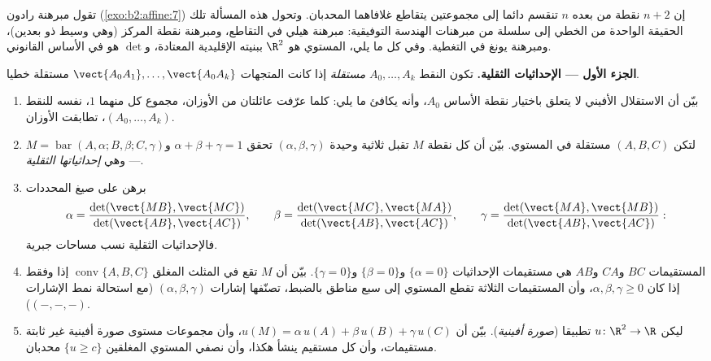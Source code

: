 \begin{problem}\label{pb:b2:affine:1}
تقول مبرهنة رادون (\cref{exo:b2:affine:7}) إن $n + 2$ نقطة من  بعده
$n$ تنقسم دائما إلى مجموعتين يتقاطع غلافاهما المحدبان. وتحول هذه
المسألة تلك الحقيقة الواحدة من  الخطي إلى سلسلة من مبرهنات
الهندسة التوفيقية: مبرهنة هيلي في التقاطع، ومبرهنة نقطة المركز (وهي
وسيط ذو بعدين)، ومبرهنة يونغ في التغطية. وفي كل ما يلي، المستوي هو
$\R^2$ ببنيته الإقليدية المعتادة، و$\det$ هو  في الأساس
القانوني.

\medskip
\noindent\textbf{الجزء الأول --- الإحداثيات الثقلية.} تكون النقط
$A_0, \dots, A_k$ \emph{مستقلة } إذا كانت المتجهات $\vect{A_0A_1}, \dots, \vect{A_0A_k}$ مستقلة خطيا.
\begin{enumerate}
  \item بيّن أن الاستقلال الأفيني لا يتعلق باختيار نقطة الأساس
        $A_0$، وأنه يكافئ ما يلي: كلما عرّفت عائلتان من الأوزان،
        مجموع كل منهما $1$،  نفسه للنقط $(A_0,
        \dots, A_k)$، تطابقت
        الأوزان.
  \item لتكن $(A, B, C)$ مستقلة  في المستوي. بيّن أن كل نقطة $M$
        تقبل ثلاثية وحيدة $(\alpha, \beta, \gamma)$ تحقق $\alpha + \beta +
        \gamma = 1$ و$M = \operatorname{bar}(A, \alpha; B,
        \beta; C, \gamma)$ --- وهي
        \emph{إحداثياتها الثقلية}.
  \item برهن على صيغ المحددات
        \[
        \alpha = \frac{\det(\vect{MB},
        \vect{MC})}{\det(\vect{AB}, \vect{AC})},
        \qquad
        \beta = \frac{\det(\vect{MC},
        \vect{MA})}{\det(\vect{AB}, \vect{AC})},
        \qquad
        \gamma = \frac{\det(\vect{MA},
        \vect{MB})}{\det(\vect{AB}, \vect{AC})} :
        \]
        فالإحداثيات الثقلية نسب مساحات جبرية.
  \item المستقيمات $BC$ و$CA$ و$AB$ هي مستقيمات الإحداثيات
        $\{\alpha = 0\}$ و$\{\beta = 0\}$ و$\{\gamma = 0\}$.
        بيّن أن $M$ تقع في المثلث المغلق $\operatorname{conv}\{A, B, C\}$ إذا وفقط إذا كان
        $\alpha, \beta,
        \gamma \geq 0$، وأن المستقيمات الثلاثة تقطع المستوي إلى سبع مناطق
        بالضبط، تصنّفها إشارات $(\alpha, \beta, \gamma)$ (مع استحالة نمط الإشارات
        $(-, -,
        -)$).
  \item ليكن $u \colon \R^2 \to \R$ تطبيقا  (\emph{صورة أفينية}). بيّن أن
        $u(M) = \alpha\,u(A) +
        \beta\,u(B) + \gamma\,u(C)$، وأن مجموعات مستوى صورة أفينية غير ثابتة مستقيمات،
        وأن كل مستقيم ينشأ هكذا، وأن نصفي المستوي المغلقين $\{u
        \geq c\}$
        محدبان.
\end{enumerate}


\end{problem}
